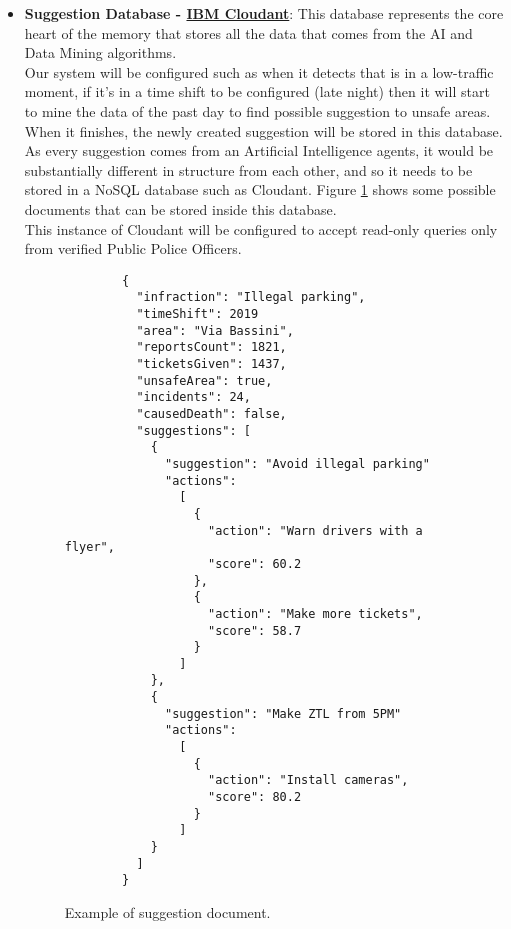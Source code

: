 \begin{itemize}
	\item \textbf{Suggestion Database - \href{https://cloud.ibm.com/catalog/services/cloudant}{IBM Cloudant}}: This database represents the core heart of the memory that stores all the data that comes from the AI and Data Mining algorithms.
	\\Our system will be configured such as when it detects that is in a low-traffic moment, if it's in a time shift to be configured (late night) then it will start to mine the data of the past day to find possible suggestion to unsafe areas. When it finishes, the newly created suggestion will be stored in this database.
	\\As every suggestion comes from an Artificial Intelligence agents, it would be substantially different in structure from each other, and so it needs to be stored in a NoSQL database such as Cloudant. Figure \ref{fig:jsondoc} shows some possible documents that can be stored inside this database.
	\\This instance of Cloudant will be configured to accept read-only queries only from verified Public Police Officers.
	\begin{figure}[h!]
		\begin{lstlisting}
		{
		  "infraction": "Illegal parking",
		  "timeShift": 2019
		  "area": "Via Bassini",
		  "reportsCount": 1821,
		  "ticketsGiven": 1437,
		  "unsafeArea": true,
		  "incidents": 24,
		  "causedDeath": false,
		  "suggestions": [
			{
			  "suggestion": "Avoid illegal parking"
			  "actions":
			    [ 
				  {
				    "action": "Warn drivers with a flyer",
				    "score": 60.2
				  },
				  {
				    "action": "Make more tickets",
				    "score": 58.7
				  }
			    ]
			},
			{
			  "suggestion": "Make ZTL from 5PM"
			  "actions":
			    [ 
			      {
			        "action": "Install cameras",
			        "score": 80.2
			      }
			    ]
			}
		  ]
		}
		\end{lstlisting}
		\caption{Example of suggestion document.}
		\label{fig:jsondoc}
	\end{figure}
	\FloatBarrier
	

\end{itemize}
